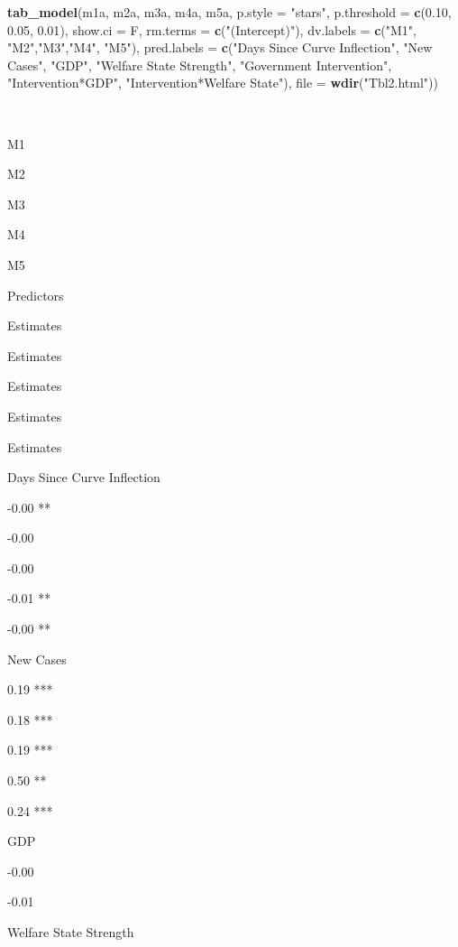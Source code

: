 \documentclass[
]{article}
\newenvironment{Shaded}{\begin{snugshade}}{\end{snugshade}}
\newcommand{\DataTypeTok}[1]{\textcolor[rgb]{0.13,0.29,0.53}{#1}}
\newcommand{\FloatTok}[1]{\textcolor[rgb]{0.00,0.00,0.81}{#1}}
\newcommand{\KeywordTok}[1]{\textcolor[rgb]{0.13,0.29,0.53}{\textbf{#1}}}
\newcommand{\NormalTok}[1]{#1}
\newcommand{\StringTok}[1]{\textcolor[rgb]{0.31,0.60,0.02}{#1}}
\begin{document}
\begin{Shaded}
\begin{Highlighting}[]
\KeywordTok{tab_model}\NormalTok{(m1a, m2a, m3a, m4a, m5a, }\DataTypeTok{p.style =} \StringTok{"stars"}\NormalTok{, }\DataTypeTok{p.threshold =} \KeywordTok{c}\NormalTok{(}\FloatTok{0.10}\NormalTok{, }\FloatTok{0.05}\NormalTok{, }\FloatTok{0.01}\NormalTok{), }\DataTypeTok{show.ci =}\NormalTok{ F, }\DataTypeTok{rm.terms =} \KeywordTok{c}\NormalTok{(}\StringTok{"(Intercept)"}\NormalTok{),  }\DataTypeTok{dv.labels =} \KeywordTok{c}\NormalTok{(}\StringTok{"M1"}\NormalTok{, }\StringTok{"M2"}\NormalTok{,}\StringTok{"M3"}\NormalTok{,}\StringTok{"M4"}\NormalTok{, }\StringTok{"M5"}\NormalTok{), }\DataTypeTok{pred.labels =} \KeywordTok{c}\NormalTok{(}\StringTok{"Days Since Curve Inflection"}\NormalTok{, }\StringTok{"New Cases"}\NormalTok{,  }\StringTok{"GDP"}\NormalTok{, }\StringTok{"Welfare State Strength"}\NormalTok{, }\StringTok{"Government Intervention"}\NormalTok{, }\StringTok{"Intervention*GDP"}\NormalTok{, }\StringTok{"Intervention*Welfare State"}\NormalTok{), }\DataTypeTok{file =} \KeywordTok{wdir}\NormalTok{(}\StringTok{"Tbl2.html"}\NormalTok{))}
\end{Highlighting}
\end{Shaded}

~

M1

M2

M3

M4

M5

Predictors

Estimates

Estimates

Estimates

Estimates

Estimates

Days Since Curve Inflection

-0.00 **

-0.00

-0.00

-0.01 **

-0.00 **

New Cases

0.19 ***

0.18 ***

0.19 ***

0.50 **

0.24 ***

GDP

-0.00

-0.01

Welfare State Strength
\end{document}
